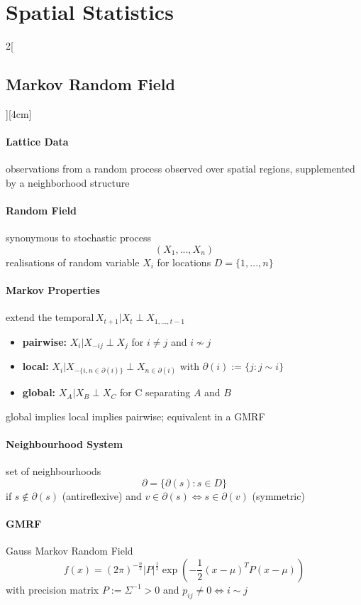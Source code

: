 \documentclass[8pt]{extarticle}
\begin{document}

\section{Spatial Statistics}

\begin{multicols}{2}[\subsection{Markov Random Field}][4cm] 
\paragraph{Lattice Data} observations from a random process observed over spatial regions,  supplemented by a neighborhood structure

\paragraph{Random Field} synonymous to stochastic process
$$(X_1,...,X_n)$$
realisations of random variable $X_i$ 
for locations $D=\{1,...,n\}$

\paragraph{Markov Properties} extend the temporal\,$X_{t{+}1}|X_t \perp X_{1,...,t-{}1}$
\begin{itemize}
\item \textbf{pairwise:} $X_i|X_{-ij}\perp X_j$ for $i\neq j$ and $i \not\sim j$
\item \textbf{local:} $X_i|X_{-\{i,n\in \partial (i)\}}\perp X_{n\in \partial (i)}$ with $\partial (i) := \{j:j\sim i\}$
\item \textbf{global:} $X_A|X_B\perp X_C$ for C separating $A$ and $B$
\end{itemize}
\noindent global implies local implies pairwise; equivalent in a GMRF

\paragraph{Neighbourhood System} set of neighbourhoods
$$\partial = \{\partial(s): s \in D\}$$
\noindent if $s \not\in \partial(s)$ (antireflexive) and $v \in \partial(s) \Leftrightarrow s \in \partial(v)$ (symmetric)

\paragraph{GMRF} Gauss Markov Random Field
$$f(x) =  ( 2\pi)^{-\frac{n}{2}}|P|^{\frac{1}{2}} \exp\left(-\frac{1}{2}(x-\mu)^TP(x-\mu)\right)$$
\noindent with precision matrix $P:=\Sigma^{-1}>0$ and $p_{ij} \neq 0 \Leftrightarrow i\sim j$


\end{multicols}
\end{document}
